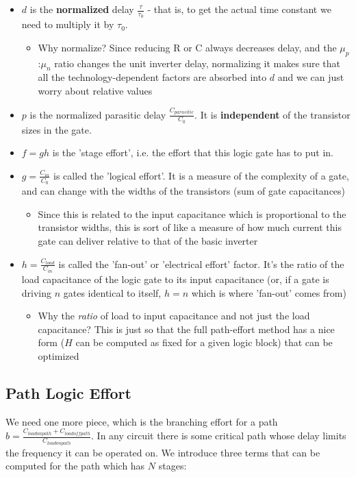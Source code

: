 \documentclass[11pt]{report}
\begin{document}
\begin{itemize}
\item $d$ is the \textbf{normalized} delay $\frac{\tau}{\tau_0}$ - that is, to get the actual time constant we need to multiply it by $\tau_0$.
\begin{itemize}
	\item Why normalize? Since reducing R or C always decreases delay, and the $\mu_p$:$\mu_n$ ratio changes the unit inverter delay, normalizing it makes sure that all the technology-dependent factors are absorbed into $d$ and we can just worry about relative values
\end{itemize}
\item $p$ is the normalized parasitic delay $\frac{C_{parasitic}}{C_0}$. It is \textbf{independent} of the transistor sizes in the gate.
\item $f = gh$ is the 'stage effort', i.e. the effort that this logic gate has to put in.
\item $g = \frac{C_{in}}{C_0}$ is called the 'logical effort'. It is a measure of the complexity of a gate, and can change with the widths of the transistors (sum of gate capacitances)
\begin{itemize}
 	\item Since this is related to the input capacitance which is proportional to the transistor widths, this is sort of like a measure of how much current this gate can deliver relative to that of the basic inverter
\end{itemize}

\item $h = \frac{C_{load}}{C_{in}}$ is called the 'fan-out' or 'electrical effort' factor. It's the ratio of the load capacitance of the logic gate to its input capacitance (or, if a gate is driving $n$ gates identical to itself, $h=n$ which is where 'fan-out' comes from)
\begin{itemize}
	\item Why the \textit{ratio} of load to input capacitance and not just the load capacitance? This is just so that the full path-effort method has a nice form ($H$ can be computed as fixed for a given logic block) that can be optimized
\end{itemize}

\end{itemize}

\subsection{Path Logic Effort}
We need one more piece, which is the branching effort for a path $b = \frac{C_{load on path} + C_{load off path}}{C_{load on path}}$. In any circuit there is some critical path whose delay limits the frequency it can be operated on. We introduce three terms that can be computed for the path which has $N$ stages:
\end{document}
